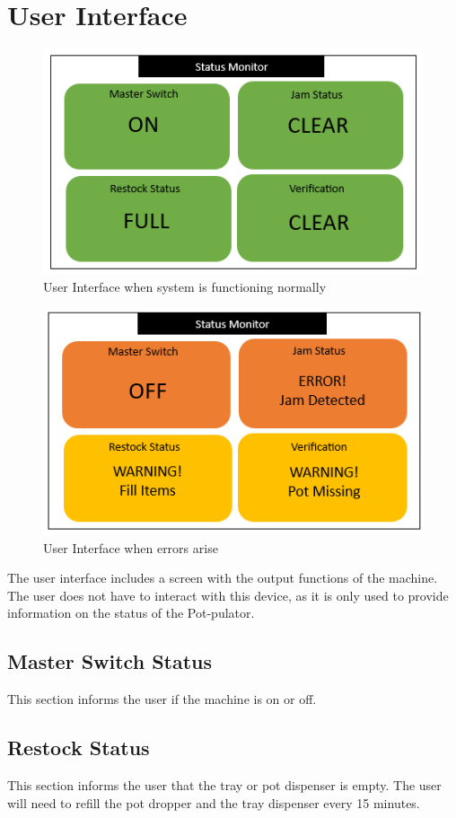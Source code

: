 \documentclass[12pt, titlepage]{article}
\begin{document}
\section{User Interface}
\begin{figure}[H]
    \centering
    \includegraphics{statusgood.png}
    \caption{User Interface when system is functioning normally}
    \label{fig:scope}
  \end{figure}

  \begin{figure}[H]
    \centering
    \includegraphics{statusbad.png}
    \caption{User Interface when errors arise}
    \label{fig:scope}
  \end{figure}
The user interface includes a screen with the output functions of the machine. The user does not have to interact with this device, as it is only used to provide information on the status of the Pot-pulator.
\subsection{Master Switch Status}
This section informs the user if the machine is on or off.
\subsection{Restock Status}
This section informs the user that the tray or pot dispenser is empty. The user will need to refill the pot dropper and the tray dispenser every 15 minutes.
\end{document}
